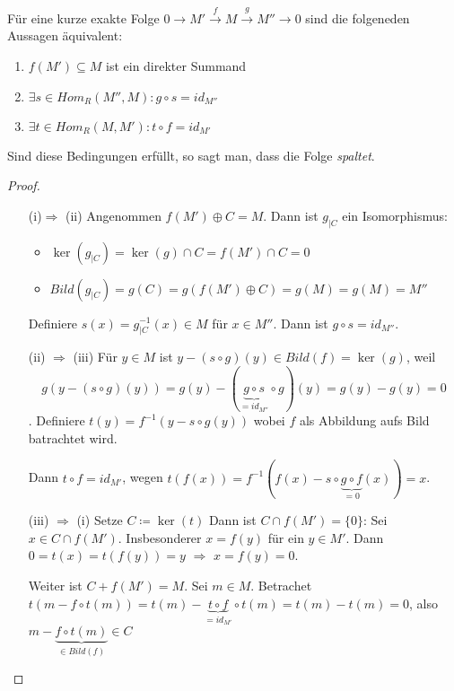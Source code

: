 \documentclass[../main.tex]{subfiles}
\begin{document}
\begin{theorem}%
    Für eine kurze exakte Folge $0\rightarrow M'\overset{f}{\rightarrow} M \overset{g}{\rightarrow} M'' \rightarrow 0$ sind die folgeneden Aussagen äquivalent:
    \begin{enumerate}[label=(\roman*)]
        \item $f(M')\subseteq M$ ist ein direkter Summand
        \item $\exists s\in Hom_R(M'',M): g\circ s = id_{M''}$
        \item $\exists t\in Hom_R(M,M'): t\circ f = id_{M'}$
    \end{enumerate}
    Sind diese Bedingungen erfüllt, so sagt man, dass die Folge \emph{spaltet}.
\end{theorem}
\begin{proof}$ $
    \begin{itemize}
        \item[(i)$\Rightarrow$ (ii)]
        Angenommen $f(M')\oplus C = M$.
        Dann ist $g_{|C}$ ein Isomorphismus:
        \begin{itemize}[noitemsep]
            \item $\ker(g_{|C}) = \ker{(g)}\cap C = f(M')\cap C = 0$
            \item $Bild(g_{|C}) = g(C) = g(f(M')\oplus C) = g(M) = g(M) = M''$
        \end{itemize}
        Definiere $s(x) = g_{|C}^{-1}(x)\in M$ für $x\in M''$.
        Dann ist $g\circ s = id_{M''}$.
        \item[(ii) $\Rightarrow$ (iii)]
        Für $y\in M$ ist $y-(s\circ g) (y) \in Bild(f) = \ker(g)$, weil $$g(y-(s\circ g) (y)) = g(y)- (\underbrace{g\circ s}_{= id_{M''}}\circ g) (y) = g(y) - g(y) = 0$$.
        Definiere $t(y) = f^{-1}(y- s\circ g (y))$ wobei $f$ als Abbildung aufs Bild batrachtet wird.
        
        Dann $t\circ f = id_{M'}$, wegen
        $t(f(x)) = f^{-1}(f(x) - s\circ \underbrace{g \circ f}_{ = 0} (x)) = x$.
        \item[(iii) $\Rightarrow$ (i)]
        Setze $C\coloneqq \ker(t)$
        Dann ist $C\cap f(M') = \{0\}$: Sei $x\in C\cap f(M')$.
        Insbesonderer $x=f(y)$ für ein $y\in M'$. Dann $0 = t(x) = t(f(y)) = y$ $\Longrightarrow$ $x = f(y) = 0$.

        Weiter ist $C+f(M') = M$. Sei $m\in M$.
        Betrachet $t(m-f\circ t(m)) = t(m) - \underbrace{t\circ f}_{=id_{M'}} \circ t(m) = t(m)-t(m) = 0$, also $m-\underbrace{f\circ t(m)}_{\in Bild(f)} \in C$
    \end{itemize}
\end{proof}
\end{document}
